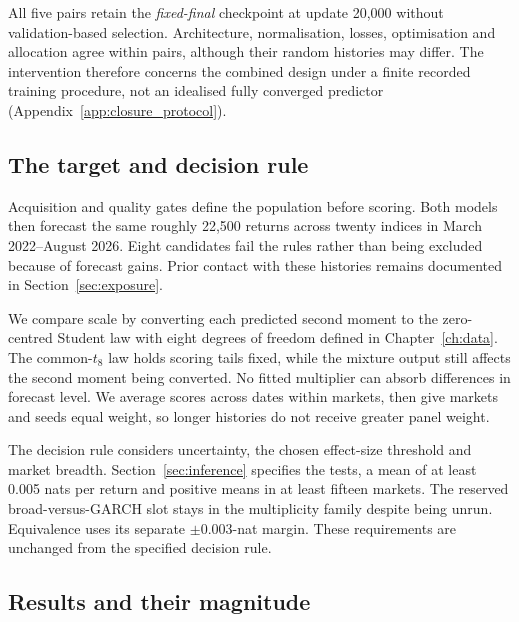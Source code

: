 All five pairs retain the \emph{fixed-final} checkpoint at update 20,000 without validation-based selection. Architecture, normalisation, losses, optimisation and allocation agree within pairs, although their random histories may differ. The intervention therefore concerns the combined design under a finite recorded training procedure, not an idealised fully converged predictor (Appendix~\ref{app:closure_protocol}).

\subsection{The target and decision rule}

Acquisition and quality gates define the population before scoring. Both models then forecast the same roughly 22,500 returns across twenty indices in March 2022--August 2026. Eight candidates fail the rules rather than being excluded because of forecast gains. Prior contact with these histories remains documented in Section~\ref{sec:exposure}.

We compare scale by converting each predicted second moment to the zero-centred Student law with eight degrees of freedom defined in Chapter~\ref{ch:data}. The common-$t_8$ law holds scoring tails fixed, while the mixture output still affects the second moment being converted. No fitted multiplier can absorb differences in forecast level. We average scores across dates within markets, then give markets and seeds equal weight, so longer histories do not receive greater panel weight.

The decision rule considers uncertainty, the chosen effect-size threshold and market breadth. Section~\ref{sec:inference} specifies the tests, a mean of at least 0.005 nats per return and positive means in at least fifteen markets. The reserved broad-versus-GARCH slot stays in the multiplicity family despite being unrun. Equivalence uses its separate $\pm0.003$-nat margin. These requirements are unchanged from the specified decision rule.

\subsection{Results and their magnitude}

